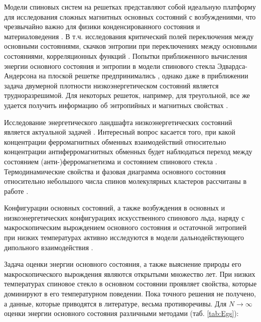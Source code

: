 \documentclass[utf8, babel, sor, jor, amsmath, amssymb, reprint]{elsarticle} %
\begin{document}
Модели спиновых систем на решетках представляют собой идеальную платформу для исследования сложных магнитных основных состояний с возбуждениями, что чрезвычайно важно для физики конденсированного состояния и материаловедения \cite{lacroix2011introduction}. В т.ч. исследования критический полей переключения между основными состояниями, скачков энтропии при переключениях между основными состояниями, корреляционных функций \cite{ramirez2004effect, rosas2004random, andriushchenko2019large}. Попытки приближенного вычисления энергии основного состояния и энтропии в модели спинового стекла Эдвардса-Андерсона на плоской решетке предпринимались \cite{perez2012ground}, однако даже в приближении задача двумерной плотности низкоэнергетическом состояний является трудноразрешимой. Для некоторых решеток, например, для треугольной, все же удается получить информацию об энтропийных и магнитных свойствах \cite{jurvcivsinova2024classical}.

Исследование энергетического ландшафта низкоэнергетических состояний является актуальной задачей \cite{biswas2023energy}. Интересный вопрос касается того, при какой концентрации ферромагнитных обменных взаимодействий относительно концентрации антиферромагнитных обменных будет наблюдаться переход между состоянием (анти-)ферромагнетизма и состоянием спинового стекла \cite{zimmer2022role}. Термодинамические свойства и фазовая диаграмма основного состояния относительно небольшого числа спинов молекулярных кластеров рассчитаны в работе \cite{dias2023ground}.

Конфигурации основных состояний, а также возбуждения в основных и низкоэнергетических конфигурациях искусственного спинового льда, наряду с макроскопическим вырождением основного состояния и остаточной энтропией  при низких температурах активно исследуются в модели дальнодействующего дипольного взаимодействия \cite{makarova2021low, singh2024micromagnetic}.

Задача оценки энергии основного состояния, а также выяснение природы его макроскопического вырождения являются открытыми множество лет. При низких температурах спиновое стекло в основном состоянии проявляет свойства, которые доминируют в его температурном поведении. Пока точного решения не получено, а данные, которые приводятся в литературе, весьма противоречивы. Для $N\rightarrow \infty$ оценки энергии основного состояния различными методами (таб. \ref{tab:Egs}):
\end{document}

